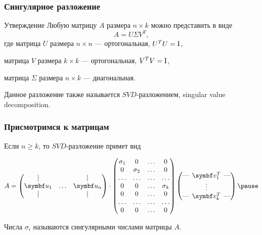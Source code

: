 \begin{frame}
  \frametitle{Сингулярное разложение}

  \begin{block}{Утверждение}
    Любую матрицу $A$ размера $n\times k$ можно представить в виде
    \[
    A = U \Sigma V^T,  
    \]
    где матрица $U$ размера $n\times n$ — ортогональная, $U^TU=\mathrm{I}$,

    матрица $V$ размера $k\times k$ — ортогональная, $V^TV=\mathrm{I}$,

    матрица $\Sigma$ размера $n\times k$ — диагональная.
    
  \end{block} \pause

  Данное разложение также называется \alert{$SVD$-разложением}, singular value decomposition.

\end{frame}
  



\begin{frame}
  \frametitle{Присмотримся к матрицам}

  Если $n\geq k$, то $SVD$-разложение примет вид

  \[
  A = \begin{pmatrix}
    \vert &  & \vert \\
    \bu_1 & \ldots & \bu_n \\
    \vert &    & \vert \\
  \end{pmatrix} \cdot 
  \begin{pmatrix}
    \sigma_1 & 0 & \ldots & 0 \\
     0 & \sigma_2 & \ldots & 0 \\
    \ldots & \ldots & \ldots & \ldots \\
0 & 0 & \ldots & \sigma_k \\
0 & 0 & \ldots & 0 \\
\ldots & \ldots & \ldots & \ldots \\
0 & 0 & \ldots & 0 \\
  \end{pmatrix} \begin{pmatrix}
\text{—}  \hspace{-0.2cm} & \bv_1^T & \hspace{-0.2cm}  \text{—} \\
 & \vdots &  \\
\text{—}  \hspace{-0.2cm} & \bv_k^T & \hspace{-0.2cm}  \text{—} \\
   \end{pmatrix} \pause
  \]

  Числа $\sigma_i$ называются \alert{сингулярными} числами матрицы $A$.
  
\end{frame}


